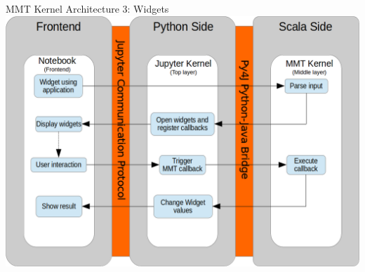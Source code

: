 \documentclass{beamer}
\begin{document}
    \begin{frame}{MMT Kernel Architecture 3: Widgets}
        \centering
        \includegraphics[scale=.35]{images/widgets}
    \end{frame}
\end{document}
